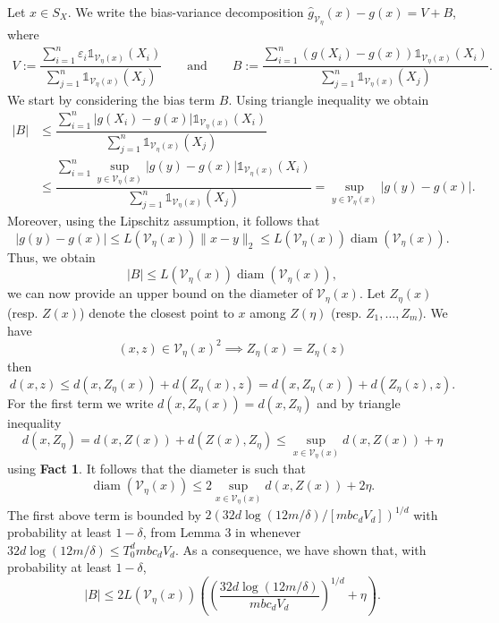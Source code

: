\documentclass[paper=a4, fontsize=11pt]{scrartcl}
\newcommand{\diam}{\operatorname{diam}}
\newcommand{\ind}{\mathds{1}}
\begin{document}
Let \(x \in S_X\). We write the bias-variance decomposition 
$\hat g_{\mathcal V_\eta}(x) - g(x) = V + B$, where \begin{align*}
    V := \dfrac{\sum_{i=1}^n \varepsilon_i \ind_{ \mathcal V_\eta(x) }(X_i)}{\sum_{j=1}^n \ind_{ \mathcal V_\eta(x) }(X_j)} \qquad \text{and}\qquad
       B := \dfrac{\sum_{i=1}^n \left(g(X_i) - g(x)\right) \ind_{ \mathcal V_\eta(x) }(X_i)}{\sum_{j=1}^n \ind_{ \mathcal V_\eta(x) }(X_j)}.
\end{align*}
   We start by considering the bias term $B$. Using triangle inequality we obtain
    \begin{align*}
     \left| B\right|
     &\leq \dfrac{\sum_{i=1}^n \left|g(X_i) - g(x)\right| \ind_{ \mathcal V_\eta(x) }(X_i)}{\sum_{j=1}^n \ind_{ \mathcal V_\eta(x) }(X_j)} \\ 
     &\leq \dfrac{\sum_{i=1}^n \sup_{y \in \mathcal V_\eta(x)} |g(y) - g(x)| \ind_{ \mathcal V_\eta(x) }(X_i)}{\sum_{j=1}^n \ind_{ \mathcal V_\eta(x) }(X_j)} = \sup_{y \in \mathcal V_\eta(x)} |g(y) - g(x)|.
\end{align*}
Moreover, using the Lipschitz assumption, it follows that
$$|g(y) - g(x)| \leq  L(\mathcal V_\eta(x)) \|x-y\|_2  \leq L(\mathcal V_\eta(x)) \diam  (\mathcal V_\eta(x) ).$$
Thus, we obtain
\begin{equation*}
    |B| \leq L(\mathcal{V}_\eta(x)) \diam (\mathcal V _\eta (x) ),
\end{equation*}
we can now provide an upper bound on the diameter of $\mathcal V_\eta (x) $. Let $Z_\eta (x) $ (resp. $Z(x)$) denote the closest point to $x$ among $Z(\eta) $ (resp. $Z_1,\ldots, Z_m$). We have
$$(x,z) \in \mathcal V_\eta (x) ^2 \implies Z_\eta(x) = Z_\eta(z) $$ then $$d(x,z) \leq d(x, Z_\eta(x) ) + d(Z_\eta(x) ,z) = d(x, Z_\eta(x) ) + d(Z_\eta(z) ,z). $$
For the first term we write $d(x, Z_\eta(x) ) = d(x, Z_\eta )$ and by triangle inequality
$$d(x, Z_\eta ) = d(x, Z(x)) + d(Z(x) , Z_\eta ) \leq \sup_{x \in\mathcal V_\eta (x)  } d(x, Z(x) ) + \eta $$
using \textbf{Fact 1}. It follows that the diameter is such that 
$$ \diam (\mathcal V _\eta (x) ) \leq 2\sup_{x \in \mathcal V_\eta (x)  } d(x, Z(x) ) + 2\eta. $$
The first above term is bounded by $2(32d\log(12m/\delta) / [mb c_d V_d])^{1/d}$ with probability at least $1-\delta$, from Lemma 3 in \cite{portier2021nearest} whenever $32d\log(12m/\delta) \leq  T_0^d  m b c_d V_d$. As a consequence, we have shown that, with probability at least $1-\delta$,
$$ |B|\leq 2L(\mathcal V_\eta(x))  \left( \left( \frac{32d\log(12m/\delta)}{  mb c_d V_d}\right)^{1/d}+ \eta \right).$$
\end{document}

